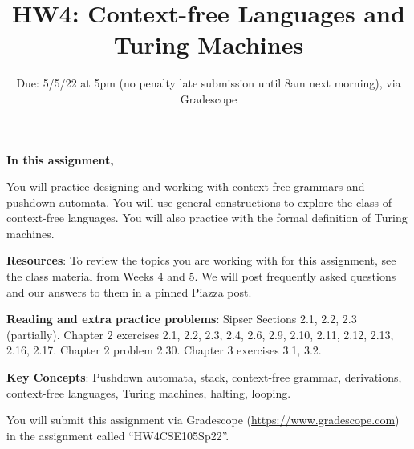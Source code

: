 \title{HW4: Context-free Languages and Turing Machines}
\date{Due: 5/5/22 at 5pm (no penalty late submission until 8am next morning), via Gradescope}


\maketitle
\thispagestyle{fancy}

{\bf In this assignment,}

You will practice designing and working with context-free grammars and 
pushdown automata. You will use general constructions to explore the class of context-free languages.
You will also practice with the formal definition of Turing machines.

{\bf Resources}: To review the topics you are working with 
for this assignment, see the class material from Weeks 4 and 5.
We will post frequently asked questions and our answers to them in a 
pinned Piazza post.

{\bf Reading and extra practice problems}: Sipser Sections 2.1, 2.2, 2.3 (partially).
Chapter 2 exercises 2.1, 2.2, 2.3, 2.4, 2.6, 2.9, 2.10, 2.11, 2.12, 2.13, 2.16, 2.17. Chapter 2 problem 2.30.
Chapter 3 exercises 3.1, 3.2.

{\bf Key Concepts}: Pushdown automata, stack, context-free grammar, derivations, context-free languages,
Turing machines, halting, looping.

\instructions

You will submit this assignment via Gradescope
(\href{https://www.gradescope.com}{https://www.gradescope.com}) 
in the assignment called ``HW4CSE105Sp22''.

